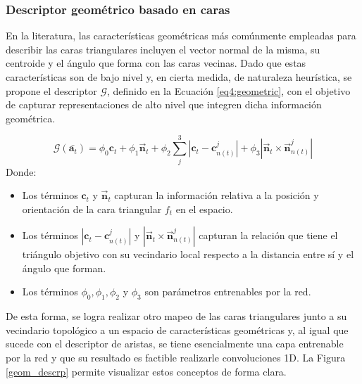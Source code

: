 \FloatBarrier

\subsubsection{Descriptor geométrico basado en caras}
En la literatura, las características geométricas más comúnmente empleadas para describir las caras triangulares incluyen el vector normal de la misma, su centroide y el ángulo que forma con las caras vecinas. Dado que estas características son de bajo nivel y, en cierta medida, de naturaleza heurística, se propone el descriptor $\mathcal{G}$, definido en la Ecuación \ref{eq4:geometric}, con el objetivo de capturar representaciones de alto nivel que integren dicha información geométrica.

\begin{equation}
\label{eq4:geometric}
    \mathcal{G}(\bar{\textbf{a}_{t}}) = \phi_{0} \textbf{c}_{t} + \phi_{1} \overrightarrow{\textbf{n}}_{t} + \phi_{2} \sum_{j}^{3} | \textbf{c}_{t} - \textbf{c}_{n(t)}^{j} | + \phi_{3} | \overrightarrow{\textbf{n}}_{t} \times \overrightarrow{\textbf{n}}_{n(t)}^j |
\end{equation}
Donde:
\begin{itemize}
    \item Los términos $\textbf{c}_{t}$ y $\overrightarrow{\textbf{n}}_{t}$ capturan la información relativa a la posición y orientación de la cara triangular $f_t$ en el espacio.
    \item Los términos $| \textbf{c}_{t} - \textbf{c}_{n(t)}^{j} |$ y $| \overrightarrow{\textbf{n}}_{t} \times \overrightarrow{\textbf{n}}_{n(t)}^j |$ capturan la relación que tiene el triángulo objetivo con su vecindario local respecto a la distancia entre sí y el ángulo que forman.
    \item Los términos $\phi_{0}, \phi_{1}, \phi_{2} $ y $\phi_{3}$ son parámetros entrenables por la red.
\end{itemize}

De esta forma, se logra realizar otro mapeo de las caras triangulares junto a su vecindario topológico a un espacio de características geométricas y, al igual que sucede con el descriptor de aristas, se tiene esencialmente una capa entrenable por la red y que su resultado es factible realizarle convoluciones 1D. La Figura \ref{geom_descrp} permite visualizar estos conceptos de forma clara.


